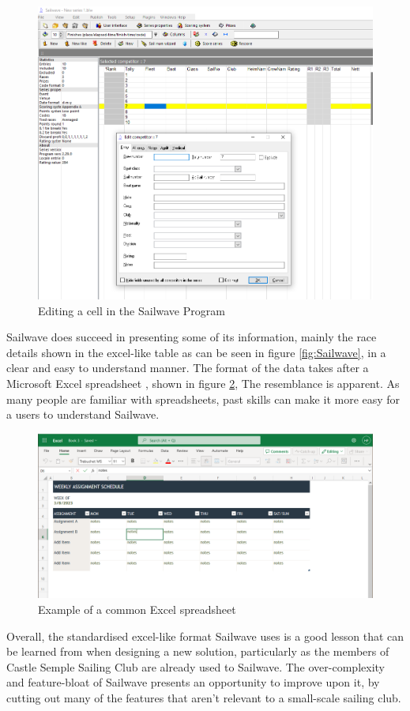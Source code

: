 \documentclass{l4proj}
\begin{document}
\begin{figure}[h!]
    \centering
    \includegraphics[width=0.6\linewidth]{images/Sailwave_edit.png} 

    \caption{Editing a cell in the Sailwave Program \citep{sailwave}
    }

    \label{fig:SailwaveEdit} 
\end{figure}

Sailwave does succeed in presenting some of its information, mainly the race details shown in the excel-like table as can be seen in figure \ref{fig:Sailwave}, in a clear and easy to understand manner. The format of the data takes after a Microsoft Excel spreadsheet \citep{Excel}, shown in figure \ref{fig:Excel}, The resemblance is apparent. As many people are familiar with spreadsheets, past skills can make it more easy for a users to understand Sailwave.

\begin{figure}[h!]
    \centering
    \includegraphics[width=0.6\linewidth]{images/Ecel.png} 

    \caption{Example of a common Excel spreadsheet \citep{Excel}
    }

    \label{fig:Excel} 
\end{figure}

Overall, the standardised excel-like format Sailwave uses is a good lesson that can be learned from when designing a new solution, particularly as the members of Castle Semple Sailing Club are already used to Sailwave. The over-complexity and feature-bloat of Sailwave presents an opportunity to improve upon it, by cutting out many of the features that aren't relevant to a small-scale sailing club.
\end{document}
